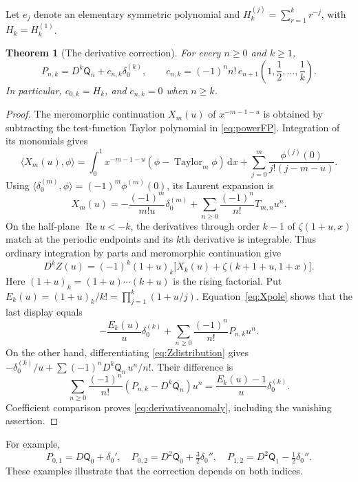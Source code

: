 \documentclass[11pt]{article}
\numberwithin{equation}{section}
\newtheorem{theorem}{Theorem}[section]
\theoremstyle{definition}\newtheorem{definition}[theorem]{Definition}
\theoremstyle{remark}\newtheorem{remark}[theorem]{Remark}
\DeclareMathOperator{\Rea}{Re}
\newcommand{\dd}{\,\mathrm d}
\newcommand{\qn}[1]{\mathsf Q_{#1}}
\begin{document}
Let $e_j$ denote an elementary symmetric polynomial and
$H_k^{(j)}=\sum_{r=1}^k r^{-j}$, with $H_k=H_k^{(1)}$.

\begin{theorem}[The derivative correction]\label{thm:derivative}
For every $n\ge0$ and $k\ge1$,
\begin{equation}\label{eq:derivativeanomaly}
 P_{n,k}=D^k\qn n+c_{n,k}\delta_0^{(k)},\qquad
 c_{n,k}=(-1)^n n!\,e_{n+1}\left(1,\frac12,\ldots,\frac1k\right).
\end{equation}
In particular, $c_{0,k}=H_k$, and $c_{n,k}=0$ when $n\ge k$.
\end{theorem}
\begin{proof}
The meromorphic continuation $X_m(u)$ of $x^{-m-1-u}$ is obtained by
subtracting the test-function Taylor polynomial in \eqref{eq:powerFP}.
Integration of its monomials gives
\[
 \langle X_m(u),\phi\rangle
 =\int_0^1x^{-m-1-u}(\phi-\operatorname{Taylor}_m\phi)\dd x
   +\sum_{j=0}^m\frac{\phi^{(j)}(0)}{j!(j-m-u)}.
\]
Using $\langle\delta_0^{(m)},\phi\rangle=(-1)^m\phi^{(m)}(0)$,
its Laurent expansion is
\begin{equation}\label{eq:Xpole}
 X_m(u)=-\frac{(-1)^m}{m!u}\delta_0^{(m)}
               +\sum_{n\ge0}\frac{(-1)^n}{n!}T_{m,n}u^n.
\end{equation}
On the half-plane $\Rea u<-k$, the derivatives through order $k-1$ of
$\zeta(1+u,x)$ match at the periodic endpoints and its $k$th derivative is
integrable. Thus ordinary integration by parts and meromorphic
continuation give
\[
 D^k Z(u)=(-1)^k(1+u)_k
                \bigl[X_k(u)+\zeta(k+1+u,1+x)\bigr].
\]
Here $(1+u)_k=(1+u)\cdots(k+u)$ is the rising factorial. Put
$E_k(u)=(1+u)_k/k!=\prod_{j=1}^k(1+u/j)$.
Equation~\eqref{eq:Xpole} shows that the last display equals
\[
 -\frac{E_k(u)}u\delta_0^{(k)}
          +\sum_{n\ge0}\frac{(-1)^n}{n!}P_{n,k}u^n.
\]
On the other hand, differentiating \eqref{eq:Zdistribution} gives
$-\delta_0^{(k)}/u+\sum(-1)^nD^k\qn n\,u^n/n!$.
Their difference is
\[
 \sum_{n\ge0}\frac{(-1)^n}{n!}(P_{n,k}-D^k\qn n)u^n
                  =\frac{E_k(u)-1}{u}\delta_0^{(k)}.
\]
Coefficient comparison proves \eqref{eq:derivativeanomaly}, including
the vanishing assertion.
\end{proof}

For example,
\[
 P_{0,1}=D\qn0+\delta_0',\quad
 P_{0,2}=D^2\qn0+\tfrac32\delta_0'',\quad
 P_{1,2}=D^2\qn1-\tfrac12\delta_0''.
\]
These examples illustrate that the correction depends on both indices.
\end{document}
